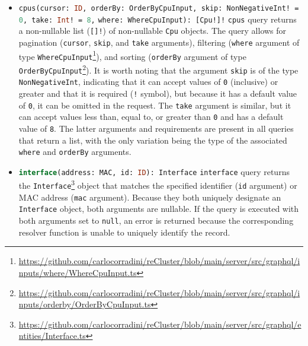 \begin{itemize}
  \item \lstinline[language=graphql, morekeywords={[2]{Cpu, OrderByCpuInput, NonNegativeInt, WhereCpuInput}},
    morekeywords={[4]{cursor, orderBy, skip, take, where}}, morekeywords={[5]{cpus}}]{cpus(cursor: ID, orderBy: OrderByCpuInput, skip: NonNegativeInt! = 0, take: Int! = 8,}
    \newline
    \hphantom{---------}\lstinline[language=graphql, morekeywords={[2]{Cpu, OrderByCpuInput, NonNegativeInt, WhereCpuInput}},
    morekeywords={[4]{cursor, orderBy, skip, take, where}}, morekeywords={[5]{cpus}}]{where: WhereCpuInput): [Cpu!]!}
    \newline
    \texttt{cpus} query returns a non-nullable list (\texttt{[]!}) of non-nullable
    \texttt{Cpu} objects.
    \newline
    The query allows for pagination (\texttt{cursor}, \texttt{skip}, and \texttt{take}
    arguments), filtering (\texttt{where} argument of type \texttt{WhereCpuInput}\footnote{\url{https://github.com/carlocorradini/reCluster/blob/main/server/src/graphql/inputs/where/WhereCpuInput.ts}}),
    and sorting (\texttt{orderBy} argument of type \texttt{OrderByCpuInput}\footnote{\url{https://github.com/carlocorradini/reCluster/blob/main/server/src/graphql/inputs/orderby/OrderByCpuInput.ts}}).
    It is worth noting that the argument \texttt{skip} is of the type \texttt{NonNegativeInt},
    indicating that it can accept values of \texttt{0} (inclusive) or greater
    and that it is required (\texttt{!} symbol), but because it has a default
    value of \texttt{0}, it can be omitted in the request. The \texttt{take}
    argument is similar, but it can accept values less than, equal to, or greater
    than \texttt{0} and has a default value of \texttt{8}. The latter arguments
    and requirements are present in all queries that return a list, with the only
    variation being the type of the associated \texttt{where} and \texttt{orderBy}
    arguments.

  \item \lstinline[language=graphql, morekeywords={[2]{MAC, Interface}}, morekeywords={[4]{address, id}},
    morekeywords={[5]{interface}}]{interface(address: MAC, id: ID): Interface}
    \newline
    \texttt{interface} query returns the \texttt{Interface}\footnote{\url{https://github.com/carlocorradini/reCluster/blob/main/server/src/graphql/entities/Interface.ts}}
    object that matches the specified identifier (\texttt{id} argument) or MAC address
    (\texttt{mac} argument).
    \newline
    Because they both uniquely designate an \texttt{Interface} object, both arguments
    are nullable. If the query is executed with both arguments set to \texttt{null},
    an error is returned because the corresponding resolver function is unable
    to uniquely identify the record.


\end{itemize}
